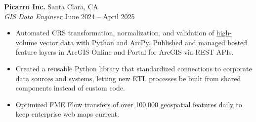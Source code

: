 \documentclass[letterpaper]{article}
\newcommand{\employer}[4]{
        \vspace{3pt}
        \textbf{#1}  %
        \hfill #2\\  %
        \textit{#3}  %
        \hfill #4\\  %
        \vspace{3mm}
    }
\newenvironment{jobtasklist}
        {
            \vspace{-12pt}
            \begin{itemize} \itemsep 0pt
        }{
            \end{itemize}
            \vspace{-3pt}
        }
\newcommand{\impt}[1]{\uline{#1}}
\begin{document}
\employer
    {Picarro Inc.}
    {Santa Clara, CA}
    {GIS Data Engineer}
    {June 2024 -- April 2025}

\begin{jobtasklist}
    \item Automated CRS transformation, normalization, and validation of
            \impt{high-volume vector data} with Python and ArcPy.
            Published and managed hosted feature layers in ArcGIS Online and Portal for ArcGIS
            via REST APIs.
    \item Created a reusable Python library that standardized connections to corporate data sources and systems,
            letting new ETL processes be built from shared components instead of custom code.
    \item Optimized FME Flow transfers of over \impt{100,000 geospatial features daily}
            to keep enterprise web maps current.
\end{jobtasklist}
\end{document}
